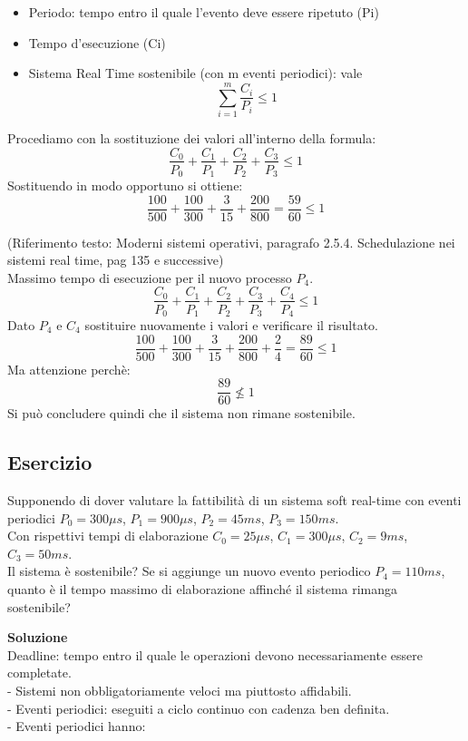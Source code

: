 \documentclass{article}
\begin{document}
\begin{itemize}
\item Periodo: tempo entro il quale l’evento deve essere ripetuto (Pi)
\item Tempo d’esecuzione (Ci)
\item Sistema Real Time sostenibile (con m eventi periodici): vale \[\sum_{i=1}^m \frac{C_i}{P_i} \le 1\]

\end{itemize}

Procediamo con la sostituzione dei valori all’interno della formula:
 \[ \frac{C_0}{P_0}+\frac{C_1}{P_1}+\frac{C_2}{P_2}+\frac{C_3}{P_3} \le 1\]
 Sostituendo in modo opportuno si ottiene:
 \[ \frac{100}{500}+\frac{100}{300}+\frac{3}{15}+\frac{200}{800} = \frac{59}{60} \le 1\]

(Riferimento testo: Moderni sistemi operativi, paragrafo 2.5.4. Schedulazione nei sistemi
real time, pag 135 e successive)\\

Massimo tempo di esecuzione per il nuovo processo $P_{4}$.
 \[ \frac{C_0}{P_0}+\frac{C_1}{P_1}+\frac{C_2}{P_2}+\frac{C_3}{P_3}+\frac{C_4}{P_4} \le 1\]
Dato  $P_{4}$ e  $C_{4}$ sostituire nuovamente i valori e verificare il risultato.
 \[ \frac{100}{500}+\frac{100}{300}+\frac{3}{15}+\frac{200}{800}+\frac{2}{4} = \frac{89}{60} \le 1\]
Ma attenzione perchè:
 \[  \frac{89}{60} \not\le 1\]
Si può concludere quindi che il sistema non rimane sostenibile.

\vskip 1.5cm

\subsection{Esercizio}

Supponendo di dover valutare la fattibilità di un sistema soft real-time con eventi periodici $P_ {0}=300 \mu s$, $P_{1}=900 \mu s$, $P_{2}=45 ms$, $P_{3} = 150 ms$.\\
Con rispettivi tempi di elaborazione $C_{0}=25 \mu s$, $C_{1}=300 \mu s$,
$C_{2}=9ms$, $C_{3}=50 ms$.\\
Il sistema è sostenibile? Se si aggiunge un nuovo evento periodico $P_{4}=110ms$, quanto è il tempo massimo di elaborazione affinché il sistema rimanga sostenibile?



\vskip 0.5cm
\textbf{Soluzione}\\

Deadline: tempo entro il quale le operazioni devono necessariamente
essere completate.\\
- Sistemi non obbligatoriamente veloci ma piuttosto affidabili.\\
- Eventi periodici: eseguiti a ciclo continuo con cadenza ben definita.\\
- Eventi periodici hanno:
\end{document}
